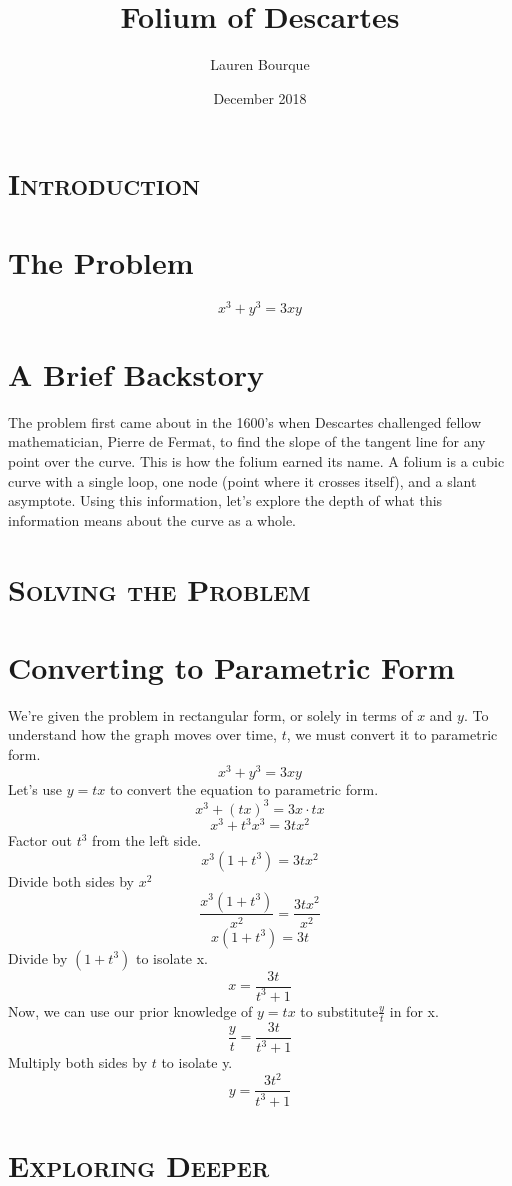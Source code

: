 \documentclass[a4paper,openright, 10pt]{article}
\title{Folium of Descartes}
\author{Lauren Bourque }
\date{December 2018}
\newcommand{\ssection}[1]{%
\section[#1]{\centering\normalfont\scshape #1}}
\begin{document}
\maketitle

\ssection{Introduction}
\section*{The Problem}
$$x^3+y^3=3xy$$ 
\section*{A Brief Backstory}
The problem first came about in the 1600's when Descartes challenged fellow mathematician, Pierre de Fermat, to  find the slope of the tangent line for any point over the curve. This is how the folium earned its name. A folium is a cubic curve with a single loop, one node (point where it crosses itself), and a slant asymptote. Using this information, let's explore the depth of what this information means about the curve as a whole.
\ssection{Solving the Problem}
\section*{Converting to Parametric Form}
We're given the problem in rectangular form, or solely in terms of $x$ and $y$. To understand how the graph moves over time, $t$, we must convert it to parametric form.
$$x^3+y^3=3xy$$
Let's use $y=tx$ to convert the equation to parametric form.
$$x^3+(tx)^3=3x\cdot tx$$
$$x^3+t^3x^3=3tx^2$$
Factor out $t^3$ from the left side.
$$x^3(1+t^3)=3tx^2$$
Divide both sides by $x^2$
$$\frac{x^3(1+t^3)}{x^2}=\frac{3tx^2}{x^2}$$
$$x(1+t^3)=3t$$
Divide by $(1+t^3)$ to isolate x.
$$x=\frac{3t}{t^3+1}$$
Now, we can use our prior knowledge of $y=tx$ to substitute$\frac{y}{t}$ in for x.
$$\frac{y}{t}=\frac{3t}{t^3+1}$$
Multiply both sides by $t$ to isolate y.
$$y=\frac{3t^2}{t^3+1}$$
\ssection{Exploring Deeper}
\end{document}
